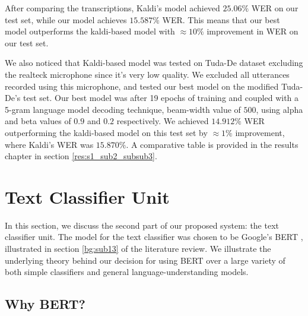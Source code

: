 After comparing the transcriptions, Kaldi's model achieved $25.06\%$ \ac{WER} on our test set, while our model achieves $15.587\%$ \ac{WER}. This means that our best model outperforms the kaldi-based model with $\approx10\%$ improvement in \ac{WER} on our test set.


We also noticed that Kaldi-based model was tested on Tuda-De dataset excluding the realteck microphone since it's very low quality. We excluded all utterances recorded using this microphone, and tested our best model on the modified Tuda-De's test set. Our best model was after 19 epochs of training and coupled with a 5-gram language model decoding technique, beam-width value of $500$, using alpha and beta values of $0.9$ and $0.2$ respectively. We achieved $14.912\%$ \ac{WER} outperforming the kaldi-based model on this test set by $\approx 1\%$ improvement, where Kaldi's \ac{WER} was $15.870\%$. A comparative table is provided in the results chapter in section \ref{res:s1_sub2_subsub3}.


\newpage

\section{Text Classifier Unit} 
\label{meth:s5}

In this section, we discuss the second part of our proposed system: the text classifier unit. The model for the text classifier was chosen to be Google's \acf{BERT} \cite{devlin2018bert}, illustrated in section \ref{bg:sub13} of the literature review. We illustrate the underlying theory behind our decision for using \ac{BERT} over a large variety of both simple classifiers and general language-understanding models.

\subsection{Why BERT?}
\label{meth:s5_sub1}

